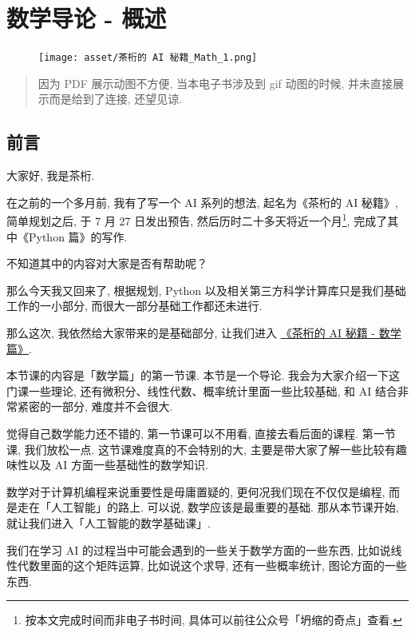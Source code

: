 \chapter{数学导论 - 概述}

\begin{figure}[ht]
  \centering\texttt{[image: asset/茶桁的 AI 秘籍\_Math\_1.png]}
\end{figure}

\newpage
\begin{quotation}
  因为 PDF 展示动图不方便, 当本电子书涉及到 gif 动图的时候, 并未直接展示而是给到了连接, 还望见谅. 
\end{quotation}

\section{前言}

大家好, 我是茶桁. 

在之前的一个多月前, 我有了写一个 AI 系列的想法, 起名为《茶桁的 AI 秘籍》, 简单规划之后, 于 7 月 27 日发出预告, 然后历时二十多天将近一个月\footnote{按本文完成时间而非电子书时间, 具体可以前往公众号「坍缩的奇点」查看. }, 完成了其中《Python 篇》的写作.  

不知道其中的内容对大家是否有帮助呢？

那么今天我又回来了, 根据规划, Python 以及相关第三方科学计算库只是我们基础工作的一小部分, 而很大一部分基础工作都还未进行. 

那么这次, 我依然给大家带来的是基础部分, 让我们进入 \href{https://mp.weixin.qq.com/mp/appmsgalbum?__biz=MzA4NzE4MDQzMg==&action=getalbum&album_id=3074770001140400130&from_itemidx=1&from_msgid=2648748768#wechat_redirect}{《茶桁的 AI 秘籍 - 数学篇》}. 

本节课的内容是「数学篇」的第一节课. 本节是一个导论. 我会为大家介绍一下这门课一些理论, 还有微积分、线性代数、概率统计里面一些比较基础, 和 AI 结合非常紧密的一部分, 难度并不会很大. 

觉得自己数学能力还不错的, 第一节课可以不用看, 直接去看后面的课程. 第一节课, 我们放松一点. 这节课难度真的不会特别的大, 主要是带大家了解一些比较有趣味性以及 AI 方面一些基础性的数学知识. 

数学对于计算机编程来说重要性是毋庸置疑的, 更何况我们现在不仅仅是编程, 而是走在「人工智能」的路上. 可以说, 数学应该是最重要的基础. 那从本节课开始, 就让我们进入「人工智能的数学基础课」. 

我们在学习 AI 的过程当中可能会遇到的一些关于数学方面的一些东西, 比如说线性代数里面的这个矩阵运算, 比如说这个求导, 还有一些概率统计, 图论方面的一些东西. 

